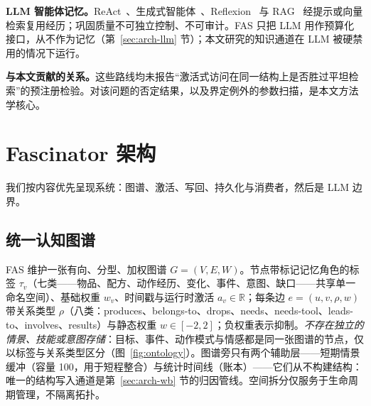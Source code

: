 \documentclass[10pt,a4paper]{ctexart}
\begin{document}
\textbf{LLM 智能体记忆。}ReAct~\citep{yao2023react}、生成式智能体~\citep{park2023generative}、Reflexion~\citep{shinn2023reflexion} 与 RAG~\citep{lewis2020rag} 经提示或向量检索复用经历；巩固质量不可独立控制、不可审计。FAS 只把 LLM 用作预算化接口，从不作为记忆（第~\ref{sec:arch-llm} 节）；本文研究的知识通道在 LLM 被硬禁用的情况下运行。

\textbf{与本文贡献的关系。}这些路线均未报告“激活式访问在同一结构上是否胜过平坦检索”的预注册检验。对该问题的否定结果，以及界定例外的参数扫描，是本文方法学核心。

\section{Fascinator 架构}
\label{sec:arch}

我们按内容优先呈现系统：图谱、激活、写回、持久化与消费者，然后是 LLM 边界。

\subsection{统一认知图谱}
\label{sec:arch-graph}
FAS 维护一张有向、分型、加权图谱 $G=(V,E,W)$。节点带标记记忆角色的标签 $\tau_v$（七类——物品、配方、动作经历、变化、事件、意图、缺口——共享单一命名空间）、基础权重 $w_v$、时间戳与运行时激活 $a_v\in\mathbb{R}$；每条边 $e=(u,v,\rho,w)$ 带关系类型 $\rho$（八类：produces、belongs-to、drops、needs、needs-tool、leads-to、involves、results）与静态权重 $w\in[-2,2]$；负权重表示抑制。\emph{不存在独立的情景、技能或意图存储}：目标、事件、动作模式与情感都是同一张图谱的节点，仅以标签与关系类型区分（图~\ref{fig:ontology}）。图谱旁只有两个辅助层——短期情景缓冲（容量 100，用于短程整合）与统计时间线（账本）——它们从不构建结构：唯一的结构写入通道是第~\ref{sec:arch-wb} 节的归因管线。空间拆分仅服务于生命周期管理，不隔离拓扑。
\end{document}
